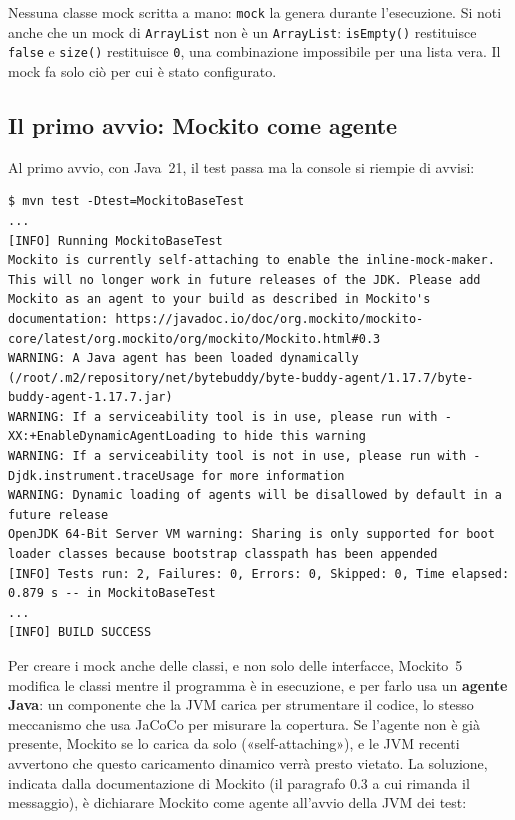 Nessuna classe mock scritta a mano: \texttt{mock} la genera durante l'esecuzione. Si noti anche che un mock di
\texttt{ArrayList} non è un \texttt{ArrayList}: \texttt{isEmpty()} restituisce \texttt{false} e \texttt{size()}
restituisce \texttt{0}, una combinazione impossibile per una lista vera. Il mock fa solo ciò per cui è stato
configurato.

\subsection{Il primo avvio: Mockito come agente}

Al primo avvio, con Java~21, il test passa ma la console si riempie di avvisi:

\begin{lstlisting}[style=shell, name=Terminale, deletecomment={[l]\#}]
$ mvn test -Dtest=MockitoBaseTest
...
[INFO] Running MockitoBaseTest
Mockito is currently self-attaching to enable the inline-mock-maker. This will no longer work in future releases of the JDK. Please add Mockito as an agent to your build as described in Mockito's documentation: https://javadoc.io/doc/org.mockito/mockito-core/latest/org.mockito/org/mockito/Mockito.html#0.3
WARNING: A Java agent has been loaded dynamically (/root/.m2/repository/net/bytebuddy/byte-buddy-agent/1.17.7/byte-buddy-agent-1.17.7.jar)
WARNING: If a serviceability tool is in use, please run with -XX:+EnableDynamicAgentLoading to hide this warning
WARNING: If a serviceability tool is not in use, please run with -Djdk.instrument.traceUsage for more information
WARNING: Dynamic loading of agents will be disallowed by default in a future release
OpenJDK 64-Bit Server VM warning: Sharing is only supported for boot loader classes because bootstrap classpath has been appended
[INFO] Tests run: 2, Failures: 0, Errors: 0, Skipped: 0, Time elapsed: 0.879 s -- in MockitoBaseTest
...
[INFO] BUILD SUCCESS
\end{lstlisting}

Per creare i mock anche delle classi, e non solo delle interfacce, Mockito~5 modifica le classi mentre il programma è
in esecuzione, e per farlo usa un \textbf{agente Java}: un componente che la JVM carica per strumentare il codice, lo
stesso meccanismo che usa JaCoCo per misurare la copertura. Se l'agente non è già presente, Mockito se lo carica da
solo («self-attaching»), e le JVM recenti avvertono che questo caricamento dinamico verrà presto vietato. La soluzione,
indicata dalla documentazione di Mockito (il paragrafo 0.3 a cui rimanda il messaggio), è dichiarare Mockito come agente
all'avvio della JVM dei test:

